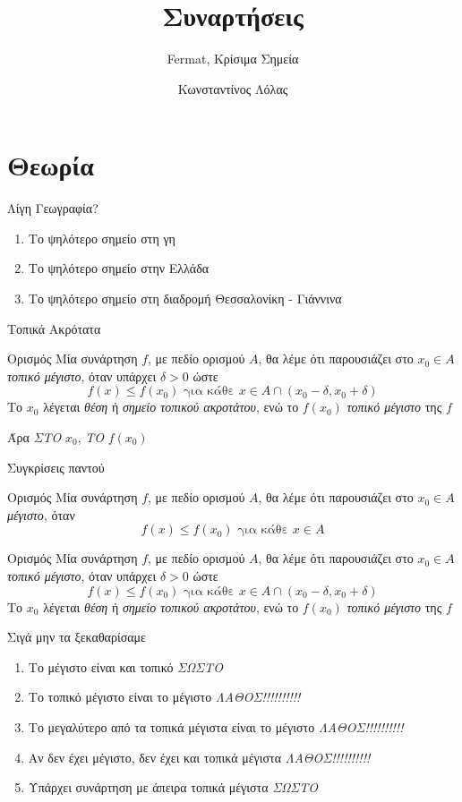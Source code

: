 \documentclass{presentation}
\title{Συναρτήσεις}
\subtitle{Fermat, Κρίσιμα Σημεία}
\author[Λόλας]{Κωνσταντίνος Λόλας}
\begin{document}
\begin{frame}
  \titlepage
\end{frame}

\section{Θεωρία}
\begin{frame}{Λίγη Γεωγραφία?}
  \begin{enumerate}
    \item<1-> Το ψηλότερο σημείο στη γη
    \item<2-> Το ψηλότερο σημείο στην Ελλάδα
    \item<3-> Το ψηλότερο σημείο στη διαδρομή Θεσσαλονίκη - Γιάννινα
  \end{enumerate}
\end{frame}

\begin{frame}{Τοπικά Ακρότατα}
  \begin{block}{Ορισμός}
    Μία συνάρτηση $f$, με πεδίο ορισμού $Α$, θα λέμε ότι παρουσιάζει στο $x_0\in Α$ \emph{τοπικό μέγιστο}, όταν υπάρχει $δ>0$ ώστε
    $$f(x)\le f(x_0) \text{ για κάθε } x\in Α\cap (x_0-δ,x_0+δ)$$
    Το $x_0$ λέγεται \emph{θέση} ή \emph{σημείο τοπικού ακροτάτου}, ενώ το $f(x_0)$ \emph{τοπικό μέγιστο} της $f$
  \end{block}
  Άρα \emph{ΣΤΟ} $x_0$, \emph{ΤΟ} $f(x_0)$
\end{frame}

\begin{frame}{Συγκρίσεις παντού}
  \begin{block}{Ορισμός}
    Μία συνάρτηση $f$, με πεδίο ορισμού $Α$, θα λέμε ότι παρουσιάζει στο $x_0\in Α$ \emph{μέγιστο}, όταν
    $$f(x)\le f(x_0) \text{ για κάθε } x\in Α$$
  \end{block}
  \begin{block}{Ορισμός}
    Μία συνάρτηση $f$, με πεδίο ορισμού $Α$, θα λέμε ότι παρουσιάζει στο $x_0\in Α$ \emph{τοπικό μέγιστο}, όταν υπάρχει $δ>0$ ώστε
    $$f(x)\le f(x_0) \text{ για κάθε } x\in Α\cap (x_0-δ,x_0+δ)$$
    Το $x_0$ λέγεται \emph{θέση} ή \emph{σημείο τοπικού ακροτάτου}, ενώ το $f(x_0)$ \emph{τοπικό μέγιστο} της $f$
  \end{block}
\end{frame}

\begin{frame}{Σιγά μην τα ξεκαθαρίσαμε}
  \begin{enumerate}
    \item<1-> Το μέγιστο είναι και τοπικό  {\emph{ΣΩΣΤΟ}}
    \item<3-> Το τοπικό μέγιστο είναι το μέγιστο  {\emph{ΛΑΘΟΣ!!!!!!!!!!}}
    \item<5-> Το μεγαλύτερο από τα τοπικά μέγιστα είναι το μέγιστο  {\emph{ΛΑΘΟΣ!!!!!!!!!!}}
    \item<7-> Αν δεν έχει μέγιστο, δεν έχει και τοπικά μέγιστα  {\emph{ΛΑΘΟΣ!!!!!!!!!!}}
    \item<9-> Υπάρχει συνάρτηση με άπειρα τοπικά μέγιστα  {\emph{ΣΩΣΤΟ}}
  \end{enumerate}
\end{frame}
\end{document}
